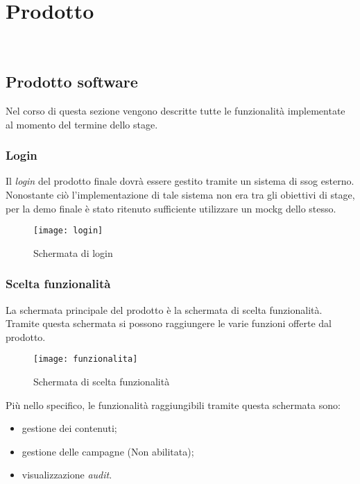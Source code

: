 
\chapter{Prodotto}
\label{cap:prodotto}

\\

\section{Prodotto software}
Nel corso di questa sezione vengono descritte tutte le funzionalità implementate al momento del termine dello stage.

\subsection{Login}
Il \textit{login} del prodotto finale dovrà essere gestito tramite un sistema di \gls{ssog} esterno. Nonostante ciò l'implementazione di tale sistema non era tra gli obiettivi di stage, per la demo finale è stato ritenuto sufficiente utilizzare un \gls{mockg} dello stesso. 
\begin{figure}[h]
    \begin{center}
    \texttt{[image: login]}
    \caption{Schermata di login}
    \label{fig:figure20}
    \end{center}
\end{figure}

\subsection{Scelta funzionalità}
La schermata principale del prodotto è la schermata di scelta funzionalità. Tramite questa schermata si possono raggiungere le varie funzioni offerte dal prodotto.
\begin{figure}[h]
    \begin{center}
    \texttt{[image: funzionalita]}
    \caption{Schermata di scelta funzionalità}
    \label{fig:figure21}
    \end{center}
\end{figure}
Più nello specifico, le funzionalità raggiungibili tramite questa schermata sono:
\begin{itemize}
    \item gestione dei contenuti;
    \item gestione delle campagne (Non abilitata);
    \item visualizzazione \textit{audit}.
\end{itemize}

